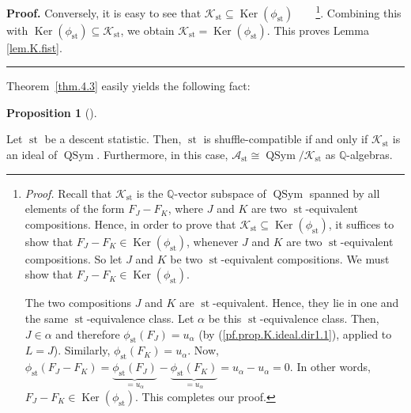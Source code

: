 \documentclass[numbers=enddot,12pt,final,onecolumn,notitlepage]{scrartcl}%
\theoremstyle{definition}
\newtheorem{prop}[theo]{Proposition}
\newenvironment{proposition}[1][]
{\begin{prop}[#1]\begin{leftbar}}
{\end{leftbar}\end{prop}}
\newenvironment{proof}[1][Proof]{\noindent\textbf{#1.} }{\ \rule{0.5em}{0.5em}}
\newenvironment{verlong}{}{}
\begin{document}
\begin{verlong}
\begin{proof}
Conversely, it is easy to see that $\mathcal{K}_{\operatorname*{st}}%
\subseteq\operatorname*{Ker}\left(  \phi_{\operatorname*{st}}\right)
$\ \ \ \ \footnote{\textit{Proof.} Recall that $\mathcal{K}%
_{\operatorname*{st}}$ is the $\mathbb{Q}$-vector subspace of
$\operatorname*{QSym}$ spanned by all elements of the form $F_{J}-F_{K}$,
where $J$ and $K$ are two $\operatorname*{st}$-equivalent compositions. Hence,
in order to prove that $\mathcal{K}_{\operatorname*{st}}\subseteq
\operatorname*{Ker}\left(  \phi_{\operatorname*{st}}\right)  $, it suffices to
show that $F_{J}-F_{K}\in\operatorname*{Ker}\left(  \phi_{\operatorname*{st}%
}\right)  $, whenever $J$ and $K$ are two $\operatorname*{st}$-equivalent
compositions. So let $J$ and $K$ be two $\operatorname*{st}$-equivalent
compositions. We must show that $F_{J}-F_{K}\in\operatorname*{Ker}\left(
\phi_{\operatorname*{st}}\right)  $.
\par
The two compositions $J$ and $K$ are $\operatorname*{st}$-equivalent. Hence,
they lie in one and the same $\operatorname*{st}$-equivalence class. Let
$\alpha$ be this $\operatorname*{st}$-equivalence class. Then, $J\in\alpha$
and therefore $\phi_{\operatorname*{st}}\left(  F_{J}\right)  =u_{\alpha}$ (by
(\ref{pf.prop.K.ideal.dir1.1}), applied to $L=J$). Similarly, $\phi
_{\operatorname*{st}}\left(  F_{K}\right)  =u_{\alpha}$. Now, $\phi
_{\operatorname*{st}}\left(  F_{J}-F_{K}\right)  =\underbrace{\phi
_{\operatorname*{st}}\left(  F_{J}\right)  }_{=u_{\alpha}}-\underbrace{\phi
_{\operatorname*{st}}\left(  F_{K}\right)  }_{=u_{\alpha}}=u_{\alpha
}-u_{\alpha}=0$. In other words, $F_{J}-F_{K}\in\operatorname*{Ker}\left(
\phi_{\operatorname*{st}}\right)  $. This completes our proof.}. Combining
this with $\operatorname*{Ker}\left(  \phi_{\operatorname*{st}}\right)
\subseteq\mathcal{K}_{\operatorname*{st}}$, we obtain $\mathcal{K}%
_{\operatorname*{st}}=\operatorname*{Ker}\left(  \phi_{\operatorname*{st}%
}\right)  $. This proves Lemma \ref{lem.K.fist}.
\end{proof}
\end{verlong}

Theorem~\ref{thm.4.3} easily yields the following fact:

\begin{proposition}
\label{prop.K.ideal}Let $\operatorname*{st}$ be a descent statistic. Then,
$\operatorname*{st}$ is shuffle-compatible if and only if $\mathcal{K}%
_{\operatorname*{st}}$ is an ideal of $\operatorname*{QSym}$. Furthermore, in
this case, $\mathcal{A}_{\operatorname*{st}}\cong\operatorname*{QSym}%
/\mathcal{K}_{\operatorname*{st}}$ as $\mathbb{Q}$-algebras.
\end{proposition}
\end{document}
